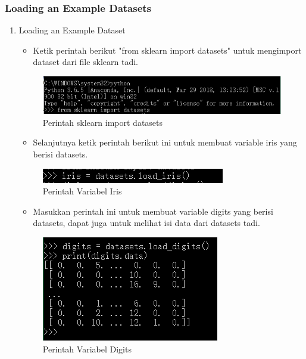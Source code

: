 \subsubsection{Loading an Example Datasets}
\begin{enumerate}
\item Loading an Example Dataset
\begin{itemize}
\item Ketik perintah berikut "from sklearn import datasets" untuk mengimport dataset dari file sklearn tadi.
\end{itemize}
\begin{figure}[ht]
\centering
\includegraphics[scale=0.5]{figures/satu.png}
\caption{Perintah sklearn import datasets}
\label{Import Datasets}
\end{figure}
\begin{itemize}
\item Selanjutnya ketik perintah berikut ini untuk membuat variable iris yang berisi datasets.
\end{itemize}
\begin{figure}[ht]
\centering
\includegraphics[scale=0.9]{figures/dua.png}
\caption{Perintah Variabel Iris}
\label{Variable Iris}
\end{figure}
\begin{itemize}
\item Masukkan perintah ini untuk membuat variable digits yang berisi datasets, dapat juga untuk melihat isi data dari datasets tadi.
\end{itemize}
\begin{figure}[ht]
\centering
\includegraphics[scale=0.9]{figures/tiga.png}
\caption{Perintah Variabel Digits}
\label{Variable Digits}
\end{figure}
\end{enumerate}


